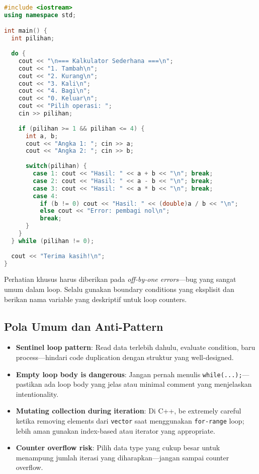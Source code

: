 \documentclass[../main.tex]{subfiles}
\begin{document}
\begin{lstlisting}[language=C++, caption={Validasi input dengan do-while (C++)}]
#include <iostream>
using namespace std;

int main() {
  int pilihan;
  
  do {
    cout << "\n=== Kalkulator Sederhana ===\n";
    cout << "1. Tambah\n";
    cout << "2. Kurang\n";
    cout << "3. Kali\n";
    cout << "4. Bagi\n";
    cout << "0. Keluar\n";
    cout << "Pilih operasi: ";
    cin >> pilihan;
    
    if (pilihan >= 1 && pilihan <= 4) {
      int a, b;
      cout << "Angka 1: "; cin >> a;
      cout << "Angka 2: "; cin >> b;
      
      switch(pilihan) {
        case 1: cout << "Hasil: " << a + b << "\n"; break;
        case 2: cout << "Hasil: " << a - b << "\n"; break;
        case 3: cout << "Hasil: " << a * b << "\n"; break;
        case 4: 
          if (b != 0) cout << "Hasil: " << (double)a / b << "\n";
          else cout << "Error: pembagi nol\n";
          break;
      }
    }
  } while (pilihan != 0);
  
  cout << "Terima kasih!\n";
}
\end{lstlisting}

Perhatian khusus harus diberikan pada \emph{off-by-one errors}—bug yang sangat umum dalam loop. Selalu gunakan boundary conditions yang eksplisit dan berikan nama variable yang deskriptif untuk loop counters.

\subsection{Pola Umum dan Anti-Pattern}
\begin{itemize}
  \item \textbf{Sentinel loop pattern}: Read data terlebih dahulu, evaluate condition, baru process—hindari code duplication dengan struktur yang well-designed.
  \item \textbf{Empty loop body is dangerous}: Jangan pernah menulis \texttt{while(...);}—pastikan ada loop body yang jelas atau minimal comment yang menjelaskan intentionality.
  \item \textbf{Mutating collection during iteration}: Di C++, be extremely careful ketika removing elements dari \texttt{vector} saat menggunakan \texttt{for-range} loop; lebih aman gunakan index-based atau iterator yang appropriate.
  \item \textbf{Counter overflow risk}: Pilih data type yang cukup besar untuk menampung jumlah iterasi yang diharapkan—jangan sampai counter overflow.
\end{itemize}
\end{document}
